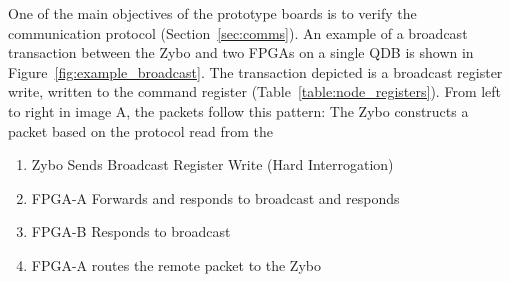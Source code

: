 One of the main objectives of the prototype boards is to verify the communication protocol (Section~\ref{sec:comms}).
An example of a broadcast transaction between the Zybo and two FPGAs on a single QDB is shown in Figure~\ref{fig:example_broadcast}.
The transaction depicted is a broadcast register write, written to the command register (Table~\ref{table:node_registers}).
From left to right in image A, the packets follow this pattern:
The Zybo constructs a packet based on the protocol read from the 

\begin{enumerate}
  \item Zybo Sends Broadcast Register Write (Hard Interrogation)
  \item FPGA-A Forwards and responds to broadcast and responds
  \item FPGA-B Responds to broadcast 
  \item FPGA-A routes the remote packet to the Zybo
\end{enumerate}

